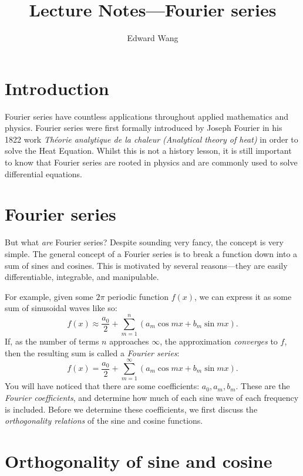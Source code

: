 \documentclass{amsart}
\title{Lecture Notes---Fourier series}
\author{Edward Wang}
\begin{document}
  \maketitle
  \tableofcontents
  
  \section{Introduction}

  Fourier series have countless applications throughout applied mathematics and physics. Fourier series were first formally introduced by Joseph Fourier in his 1822 work \emph{Théorie analytique de la chaleur (Analytical theory of heat)} in order to solve the Heat Equation. Whilst this is not a history lesson, it is still important to know that Fourier series are rooted in physics and are commonly used to solve differential equations.

  \section{Fourier series}

  But what \emph{are} Fourier series? Despite sounding very fancy, the concept is very simple. The general concept of a Fourier series is to break a function down into a sum of sines and cosines. This is motivated by several reasons---they are easily differentiable, integrable, and manipulable.

  For example, given some $2\pi$ periodic function $f(x)$, we can express it as some sum of sinusoidal waves like so:
  \[
    f(x) \approx \frac{a_0}{2} + \sum_{m=1}^{n} (a_m \cos mx + b_m \sin mx)
  .\] If, as the number of terms $n$ approaches $\infty$, the approximation \emph{converges} to $f$, then the resulting sum is called a \emph{Fourier series}:
  \[
    f(x) = \frac{a_0}{2} + \sum_{m=1}^{\infty} (a_m \cos mx + b_m \sin mx)
  .\] You will have noticed that there are some coefficients: $a_0, a_m, b_m$. These are the \emph{Fourier coefficients}, and determine how much of each sine wave of each frequency is included. Before we determine these coefficients, we first discuss the \emph{orthogonality relations} of the sine and cosine functions.

  \section{Orthogonality of sine and cosine}
\end{document}
